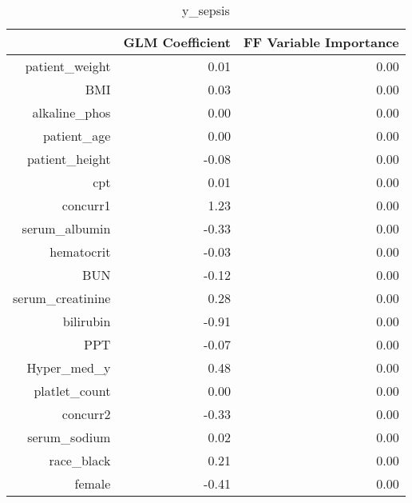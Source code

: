 \begin{table}[ht]
\centering
\begin{tabular}{rrr}
  \hline
 & GLM Coefficient & FF Variable Importance \\ 
  \hline
patient\_weight & 0.01 & 0.00 \\ 
  BMI & 0.03 & 0.00 \\ 
  alkaline\_phos & 0.00 & 0.00 \\ 
  patient\_age & 0.00 & 0.00 \\ 
  patient\_height & -0.08 & 0.00 \\ 
  cpt & 0.01 & 0.00 \\ 
  concurr1 & 1.23 & 0.00 \\ 
  serum\_albumin & -0.33 & 0.00 \\ 
  hematocrit & -0.03 & 0.00 \\ 
  BUN & -0.12 & 0.00 \\ 
  serum\_creatinine & 0.28 & 0.00 \\ 
  bilirubin & -0.91 & 0.00 \\ 
  PPT & -0.07 & 0.00 \\ 
  Hyper\_med\_y & 0.48 & 0.00 \\ 
  platlet\_count & 0.00 & 0.00 \\ 
  concurr2 & -0.33 & 0.00 \\ 
  serum\_sodium & 0.02 & 0.00 \\ 
  race\_black & 0.21 & 0.00 \\ 
  female & -0.41 & 0.00 \\ 
   \hline
\end{tabular}
\caption{y_sepsis} 
\end{table}


